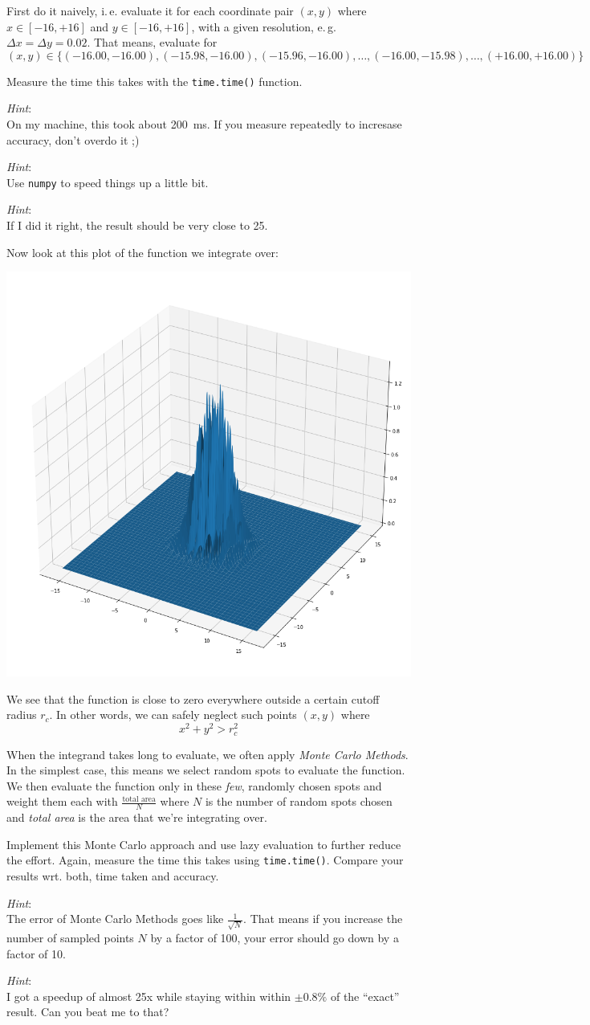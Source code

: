 \documentclass[
	english,
	fontsize=10pt,
	parskip=half,
	titlepage=true,
	DIV=12
]{scrartcl}
\newcommand*{\ie}{i.\,e.\xspace}
\newcommand*{\eg}{e.\,g.\xspace}
\begin{document}
First do it naively, \ie evaluate it for each coordinate pair $(x, y)$ where $x \in [-16, +16]$ and $y \in [-16, +16]$, with a given resolution, \eg $\Delta x = \Delta y = 0.02$. That means, evaluate for
\[ (x, y) \in \{(-16.00, -16.00), (-15.98, -16.00), (-15.96, -16.00), \ldots, (-16.00, -15.98), \ldots, (+16.00, +16.00) \} \]

Measure the time this takes with the \texttt{time.time()} function.

\emph{Hint}:\\
On my machine, this took about \SI{200}{ms}. If you measure repeatedly to incresase accuracy, don't overdo it ;)

\emph{Hint}:\\
Use \texttt{numpy} to speed things up a little bit.

\emph{Hint}:\\
If I did it right, the result should be very close to 25.

Now look at this plot of the function we integrate over:
\begin{center}
	\includegraphics[width=0.6\linewidth]{func}
\end{center}

We see that the function is close to zero everywhere outside a certain cutoff radius $r_c$. In other words, we can safely neglect such points $(x, y)$ where
\[ x^2 + y^2 > r_c^2 \]

When the integrand takes long to evaluate, we often apply \emph{Monte Carlo Methods}. In the simplest case, this means we select random spots to evaluate the function. We then evaluate the function only in these \emph{few}, randomly chosen spots and weight them each with $\frac{\text{total area}}{N}$ where $N$ is the number of random spots chosen and \emph{total area} is the area that we're integrating over.

Implement this Monte Carlo approach and use lazy evaluation to further reduce the effort. Again, measure the time this takes using \texttt{time.time()}. Compare your results wrt. both, time taken and accuracy.

\emph{Hint}:\\
The error of Monte Carlo Methods goes like $\frac{1}{\sqrt{N}}$. That means if you increase the number of sampled points $N$ by a factor of 100, your error should go down by a factor of 10.

\emph{Hint}:\\
I got a speedup of almost 25x while staying within within $\pm 0.8\%$ of the \enquote{exact} result. Can you beat me to that?
\end{document}
